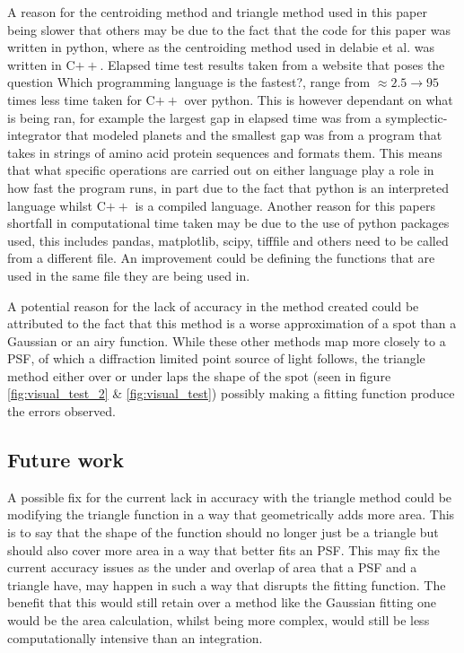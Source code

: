 \documentclass[aps,pra,a4paper,nofootinbib,onecolumn,tightenlines,longbibliography,12pt,amsfonts,amssymb,amsmath,floatfix]{revtex4-2} %
\begin{document}
  A reason for the centroiding method and triangle method used in this paper being slower that others may 
  be due to the fact that the code for this paper was written in python, where as the centroiding method used in 
  delabie et al. was written in C$++$. Elapsed time test results taken from a website that poses the question 
  Which programming language is the fastest?\cite{bagley}, range from $\approx 2.5\rightarrow 95$ times 
  less time taken for C$++$ over python. This is however dependant on what is being ran, for example the largest 
  gap in elapsed time was from a symplectic-integrator that modeled planets and the smallest gap was from a program 
  that takes in strings of amino acid protein sequences and formats them. This means that what specific operations 
  are carried out on either language play a role in how fast the program runs, in part due to the fact that 
  python is an interpreted language whilst C$++$ is a compiled language.
  Another reason for this papers shortfall in computational time taken may be due to the use of python 
  packages used, this includes pandas, matplotlib, scipy, tifffile and others need to be called from 
  a different file. An improvement could be defining the functions that are used in the same file they are 
  being used in.

  A potential reason for the lack of accuracy in the method created could be attributed to the fact that 
  this method is a worse approximation of a spot than a Gaussian or an airy function. While these other 
  methods map more closely to a PSF, of which a diffraction limited point source of light follows, the triangle 
  method either over or under laps the shape of the spot (seen in figure \ref{fig:visual_test_2} \& \ref{fig:visual_test}) 
  possibly making a fitting function produce the errors observed.


  \subsection{Future work} %
  \label{sub:Discuss improvement}
  

  A possible fix for the current lack in accuracy with the triangle method could be modifying the 
  triangle function in a way that geometrically adds more area. This is to say that the shape of the function 
  should no longer just be a triangle but should also cover more area in a way that better fits an PSF. 
  This may fix the current accuracy issues as the under and overlap of area that a PSF and a triangle 
  have, may happen in such a way that disrupts the fitting function. The benefit that this would still 
  retain over a method like the Gaussian fitting one would be the area calculation, whilst being more complex, 
  would still be less computationally intensive than an integration. 
\end{document}
